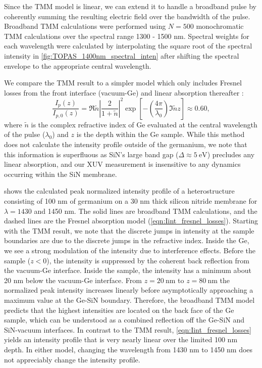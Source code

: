 Since the TMM model is linear, we can extend it to handle a broadband pulse by coherently summing the resulting electric field over the bandwidth of the pulse. Broadband TMM calculations were performed using $N=500$ monochromatic TMM calculations over the spectral range 1300 - 1500 nm. Spectral weights for each wavelength were calculated by interpolating the square root of the spectral intensity in \cref{fig:TOPAS_1400nm_spectral_inten} after shifting the spectral envelope to the appropriate central wavelength.

We compare the TMM result to a simpler model which only includes Fresnel losses from the front interface (vacuum-Ge) and linear absorption thereafter \cite{zurchDirectSimultaneousObservation2017}:
\begin{equation}
\frac{I_p(z)}{I_{p,0}(z)} = \Re{\tilde{n}} \left| \frac{2}{1+\tilde{n}} \right|^2 \exp \left[ - \left( \frac{4 \pi}{\lambda_0} \right) \Im{\tilde{n}} z \right] \approx 0.60,
\label{eqn:Iint_fresnel_losses}
\end{equation}
where $\tilde{n}$ is the complex refractive index of Ge evaluated at the central wavelength of the pulse ($\lambda_0$) and $z$ is the depth within the Ge sample. While this method does not calculate the intensity profile outside of the germanium, we note that this information is superfluous as SiN's large band gap ($\Delta \approx 5 \ \textrm{eV}$) precludes any linear absorption, and our XUV measurement is insensitive to any dynamics occurring within the SiN membrane.

 shows the calculated peak normalized intensity profile of a heterostructure consisting of 100 nm of germanium on a 30 nm thick silicon nitride membrane for ${\lambda = 1430}$ and 1450 nm. The solid lines are broadband TMM calculations, and the dashed lines are the Fresnel absorption model (\cref{eqn:Iint_fresnel_losses}). Starting with the TMM result, we note that the discrete jumps in intensity at the sample boundaries are due to the discrete jumps in the refractive index. Inside the Ge, we see a strong modulation of the intensity due to interference effects. Before the sample ($z < 0$), the intensity is suppressed by the coherent back reflection from the vacuum-Ge interface. Inside the sample, the intensity has a minimum about 20 nm below the vacuum-Ge interface. From $z=20 \ \textrm{nm}$ to $z=80 \ \textrm{nm}$ the normalized peak intensity increases linearly before asymptotically approaching a maximum value at the Ge-SiN boundary. Therefore, the broadband TMM model predicts that the highest intensities are located on the back face of the Ge sample, which can be understood as a combined reflection off the Ge-SiN and SiN-vacuum interfaces. In contrast to the TMM result, \cref{eqn:Iint_fresnel_losses} yields an intensity profile that is very nearly linear over the limited 100 nm depth. In either model, changing the wavelength from 1430 nm to 1450 nm does not appreciably change the intensity profile.

